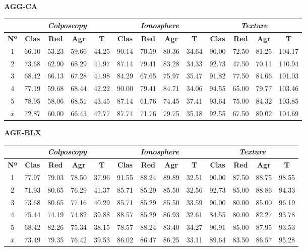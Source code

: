 \documentclass[12pt]{article}
\begin{document}
\textbf{AGG-CA}

\begin{table}[ht!]
\begin{tabular}{ccccc|cccc|cccc}
\centering
 & \multicolumn{4}{c}{\textit{Colposcopy}} & \multicolumn{4}{c}{\textit{Ionosphere}} & \multicolumn{4}{c}{\textit{Texture}} \\ \hline
\textbf{Nº} & \textbf{Clas} & \textbf{Red} & \textbf{Agr} & \textbf{T} & \textbf{Clas} & \textbf{Red} & \textbf{Agr} & \textbf{T} & \textbf{Clas} & \textbf{Red} & \textbf{Agr} & \textbf{T} \\ \hline
1 & 66.10 & 53.23 & 59.66 & 44.25 & 90.14 & 70.59 & 80.36 & 34.64 & 90.00 & 72.50 & 81.25 & 104.17 \\
2 & 73.68 & 62.90 & 68.29 & 41.97 & 87.14 & 79.41 & 83.28 & 34.33 & 92.73 & 47.50 & 70.11 & 110.94 \\
3 & 68.42 & 66.13 & 67.28 & 41.98 & 84.29 & 67.65 & 75.97 & 35.47 & 91.82 & 77.50 & 84.66 & 101.03 \\
4 & 77.19 & 59.68 & 68.44 & 42.22 & 90.00 & 79.41 & 84.71 & 34.06 & 94.55 & 65.00 & 79.77 & 103.46 \\
5 & 78.95 & 58.06 & 68.51 & 43.45 & 87.14 & 61.76 & 74.45 & 37.41 & 93.64 & 75.00 & 84.32 & 103.85 \\
\hline
$\bar{x}$ & 72.87 & 60.00 & 66.43 & 42.77 & 87.74 & 71.76 & 79.75 & 35.18 & 92.55 & 67.50 & 80.02 & 104.69 \\
\end{tabular}
\end{table}
\newpage

\textbf{AGE-BLX}

\begin{table}[ht!]
\begin{tabular}{ccccc|cccc|cccc}
\centering
 & \multicolumn{4}{c}{\textit{Colposcopy}} & \multicolumn{4}{c}{\textit{Ionosphere}} & \multicolumn{4}{c}{\textit{Texture}} \\ \hline
\textbf{Nº} & \textbf{Clas} & \textbf{Red} & \textbf{Agr} & \textbf{T} & \textbf{Clas} & \textbf{Red} & \textbf{Agr} & \textbf{T} & \textbf{Clas} & \textbf{Red} & \textbf{Agr} & \textbf{T} \\ \hline
1 & 77.97 & 79.03 & 78.50 & 37.96 & 91.55 & 88.24 & 89.89 & 32.51 & 90.00 & 87.50 & 88.75 & 98.55 \\
2 & 71.93 & 80.65 & 76.29 & 41.37 & 85.71 & 85.29 & 85.50 & 32.56 & 92.73 & 85.00 & 88.86 & 94.33 \\
3 & 73.68 & 80.65 & 77.16 & 40.29 & 85.71 & 85.29 & 85.50 & 33.59 & 90.00 & 80.00 & 85.00 & 96.19 \\
4 & 75.44 & 74.19 & 74.82 & 39.88 & 88.57 & 85.29 & 86.93 & 32.61 & 84.55 & 80.00 & 82.27 & 93.78 \\
5 & 68.42 & 82.26 & 75.34 & 38.15 & 78.57 & 88.24 & 83.40 & 34.27 & 90.91 & 85.00 & 87.95 & 93.53 \\
\hline
$\bar{x}$ & 73.49 & 79.35 & 76.42 & 39.53 & 86.02 & 86.47 & 86.25 & 33.11 & 89.64 & 83.50 & 86.57 & 95.28 \\
\end{tabular}
\end{table}
\end{document}
